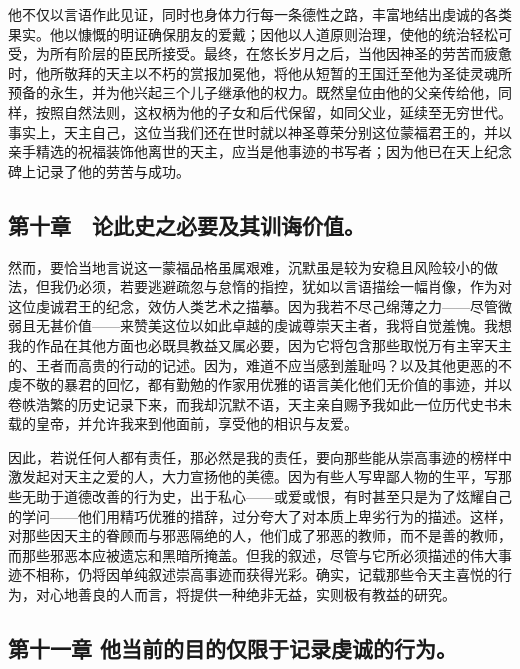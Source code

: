 他不仅以言语作此见证，同时也身体力行每一条德性之路，丰富地结出虔诚的各类果实。他以慷慨的明证确保朋友的爱戴；因他以人道原则治理，使他的统治轻松可受，为所有阶层的臣民所接受。最终，在悠长岁月之后，当他因神圣的劳苦而疲惫时，他所敬拜的天主以不朽的赏报加冕他，将他从短暂的王国迁至他为圣徒灵魂所预备的永生，并为他兴起三个儿子继承他的权力。既然皇位由他的父亲传给他，同样，按照自然法则，这权柄为他的子女和后代保留，如同父业，延续至无穷世代。事实上，天主自己，这位当我们还在世时就以神圣尊荣分别这位蒙福君王的，并以亲手精选的祝福装饰他离世的天主，应当是他事迹的书写者；因为他已在天上纪念碑上记录了他的劳苦与成功。\par


\subsection{第十章　论此史之必要及其训诲价值。}

然而，要恰当地言说这一蒙福品格虽属艰难，沉默虽是较为安稳且风险较小的做法，但我仍必须，若要逃避疏忽与怠惰的指控，犹如以言语描绘一幅肖像，作为对这位虔诚君王的纪念，效仿人类艺术之描摹。因为我若不尽己绵薄之力——尽管微弱且无甚价值——来赞美这位以如此卓越的虔诚尊崇天主者，我将自觉羞愧。我想我的作品在其他方面也必既具教益又属必要，因为它将包含那些取悦万有主宰天主的、王者而高贵的行动的记述。因为，难道不应当感到羞耻吗？以及其他更恶的不虔不敬的暴君的回忆，都有勤勉的作家用优雅的语言美化他们无价值的事迹，并以卷帙浩繁的历史记录下来，而我却沉默不语，天主亲自赐予我如此一位历代史书未载的皇帝，并允许我来到他面前，享受他的相识与友爱。\par

因此，若说任何人都有责任，那必然是我的责任，要向那些能从崇高事迹的榜样中激发起对天主之爱的人，大力宣扬他的美德。因为有些人写卑鄙人物的生平，写那些无助于道德改善的行为史，出于私心——或爱或恨，有时甚至只是为了炫耀自己的学问——他们用精巧优雅的措辞，过分夸大了对本质上卑劣行为的描述。这样，对那些因天主的眷顾而与邪恶隔绝的人，他们成了邪恶的教师，而不是善的教师，而那些邪恶本应被遗忘和黑暗所掩盖。但我的叙述，尽管与它所必须描述的伟大事迹不相称，仍将因单纯叙述崇高事迹而获得光彩。确实，记载那些令天主喜悦的行为，对心地善良的人而言，将提供一种绝非无益，实则极有教益的研究。\par


\subsection{第十一章  他当前的目的仅限于记录虔诚的行为。}

